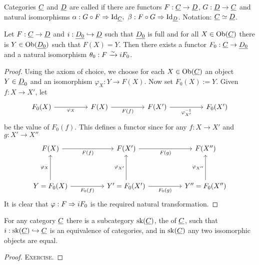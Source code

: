 \begin{definition*}
	Categories \( \underline{C} \) and \( \underline{D} \) are called  if there are functors \( F: \underline{C} \to \underline{D} \), \( G: \underline{D} \to \underline{C} \) and natural isomorphisms \( \alpha: G \circ F \Rightarrow \mathrm{Id}_{\underline{C}},~ \beta: F \circ G \Rightarrow \mathrm{Id}_{\underline{D}} \). Notation: \( \underline{C} \simeq \underline{D} \).
\end{definition*}

\begin{lemma*}
	Let \( F: \underline{C} \to \underline{D} \) and \( i: \underline{D_0} \hookrightarrow \underline{D} \) such that \( \underline{D_0} \) is full and for all \( X \in \operatorname{Ob}(\underline{C}) \) there is \( Y \in \operatorname{Ob}(\underline{D_0}) \) such that \( F(X) = Y \). Then there exists a functor \( F_0: \underline{C} \to \underline{D_0} \) and a natural isomorphism \( \theta_0: F \xrightarrow{\sim} i F_0 \).
\end{lemma*}
\begin{proof}
	Using the axiom of choice, we choose for each \( X \in \operatorname{Ob}(\underline{C}) \) an object \( Y \in \underline{D}_0 \) and an isomorphism \( \varphi_X: Y \to F(X) \). Now set \( F_0(X) := Y \). Given \( f: X \to X' \), let
	\[
		\begin{tikzcd}{F_0(X)} && {F(X)} && {F(X')} && {F_0(X')}
			\arrow["{\varphi_X}"', from=1-1, to=1-3]
			\arrow["{F(f)}"', from=1-3, to=1-5]
			\arrow["{\varphi_{X'}^{-1}}"', from=1-5, to=1-7]
		\end{tikzcd}
	\]
	be the value of \( F_0(f) \). This defines a functor since for any \( f: X \to X' \) and \( g: X' \to X'' \)
	\[
		\begin{tikzcd}{F(X)} && {F(X')} && {F(X'')} \\
			\\
			{Y=F_0(X)} && {Y'=F_0(X')} && {Y''=F_0(X'')}
			\arrow["{F(f)}"', from=1-1, to=1-3]
			\arrow["{F(g)}"', from=1-3, to=1-5]
			\arrow["{\varphi_X}", from=3-1, to=1-1]
			\arrow["{F_0(f)}"', from=3-1, to=3-3]
			\arrow["{\varphi_{X'}}", from=3-3, to=1-3]
			\arrow["{F_0(g)}"', from=3-3, to=3-5]
			\arrow["{\varphi_{X''}}", from=3-5, to=1-5]
		\end{tikzcd}
	\]
	It is clear that \( \varphi: F \Rightarrow i F_0 \) is the required natural transformation.
\end{proof}

\begin{corollary*}
	For any category \( \underline{C} \) there is a subcategory \( \operatorname{sk}(\underline{C}) \), the  of \( \underline{C} \), such that \( i: \operatorname{sk}(\underline{C}) \hookrightarrow \underline{C} \) is an equivalence of categories, and in \( \operatorname{sk}(\underline{C}) \) any two issomorphic objects are equal.
\end{corollary*}
\begin{proof}
	\textsc{Exercise}.
\end{proof}